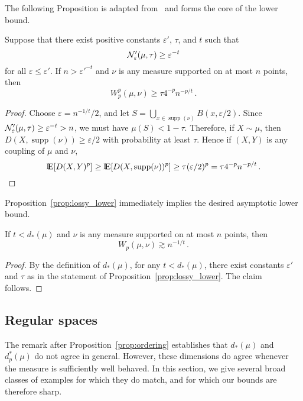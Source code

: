\documentclass[sts]{imsart}
\newcommand*{\ep}{\varepsilon}
\DeclareMathOperator{\supp}{supp}
\begin{document}
The following Proposition is adapted from~\cite{Dud68} and forms the core of the lower bound.
\begin{proposition}\label{prop:lossy_lower}
Suppose that there exist positive constants $\ep'$, $\tau$, and $t$ such that
\begin{equation*}
\cN_\ep'(\mu, \tau) \geq \ep^{-t}
\end{equation*}
for all $\ep \leq \ep'$.
If $n > {\ep'}^{-t}$ and $\nu$ is any measure supported on at most $n$ points, then
\begin{equation*}
W^p_p(\mu, \nu) \geq \tau 4^{-p} n^{-p/t}\,.
\end{equation*}
\end{proposition}
\begin{proof}
Choose $\ep = n^{-1/t}/2$, and let $S = \bigcup_{x \in \supp(\nu)} B(x, \ep/2)$.
Since $\cN'_\ep(\mu, \tau) \geq \ep^{-t} > n$, we must have $\mu(S) < 1 - \tau$.
Therefore, if $X \sim \mu$, then $D(X, \supp(\nu)) \geq \ep/2$ with probability at least $\tau$.
Hence if $(X, Y)$ is any coupling of $\mu$ and $\nu$,
\begin{equation*}
\E[D(X, Y)^p] \geq \E[D(X, \supp(\nu))^p] \geq \tau (\ep/2)^p = \tau 4^{-p} n^{-p/t}\,.
\end{equation*}
\end{proof}

Proposition~\ref{prop:lossy_lower} immediately implies the desired asymptotic lower bound.
\begin{corollary}\label{cor:lower_bound}
If $t < d_*(\mu)$ and $\nu$ is any measure supported on at most $n$ points, then
\begin{equation*}
W_p(\mu, \nu) \gtrsim n^{-1/t}\,.
\end{equation*}
\end{corollary}
\begin{proof}
By the definition of $d_*(\mu)$, for any $t < d_*(\mu)$, there exist constants $\ep'$ and $\tau$ as in the statement of Proposition~\ref{prop:lossy_lower}.
The claim follows.
\end{proof}
\subsection{Regular spaces}
The remark after Proposition~\ref{prop:ordering} establishes that $d_*(\mu)$ and $d^*_p(\mu)$ do not agree in general.
However, these dimensions do agree whenever the measure is sufficiently well behaved.
In this section, we give several broad classes of examples for which they do match, and for which our bounds are therefore sharp.
\end{document}
